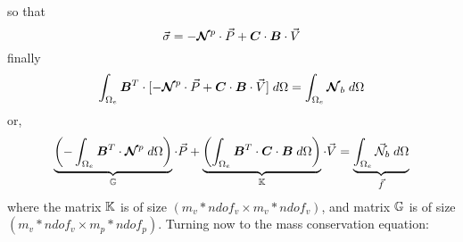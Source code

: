 so that
\begin{equation}
\vec{\sigma} 
= - {\bm {{\mathcal{N}}}}^p
 \cdot {\vec P}  + 
{\bm C} \cdot  {\bm B}\cdot {\vec V}
\end{equation}
finally
\begin{equation}
\int_{\Omega_e} {\bm B}^T \cdot 
[
- {\bm {{\mathcal{N}}}}^p  \cdot {\vec P}  + {\bm C} \cdot  {\bm B}\cdot {\vec V}
]
\; d\Omega
=
\int_{\Omega_e} {\bm {{\mathcal{N}}}}_b \; d\Omega 
\end{equation}
or,
\begin{equation}
\underbrace{\left(-\int_{\Omega_e} {\bm B}^T \cdot 
{\bm {{\mathcal{N}}}}^p  
\; d\Omega \right)}_{{\mathbb{G}}} \cdot {\vec P} 
+
\underbrace{
\left(
\int_{\Omega_e} {\bm B}^T \cdot 
{\bm C} \cdot  {\bm B}
\; d\Omega
\right)}_{{\mathbb{K}}}
\cdot {\vec V}
=
\underbrace{\int_{\Omega_e} {\vec {{\mathcal{N}}}}_b \; d\Omega }_{\vec f}
\end{equation}
where the matrix ${\mathbb{K}}$ is of size $(m_v*ndof_v \times m_v*ndof_v)$, 
and matrix ${{\mathbb{G}}}$ is of size $(m_v*ndof_v \times m_p*ndof_p)$.
Turning now to the mass conservation equation:

